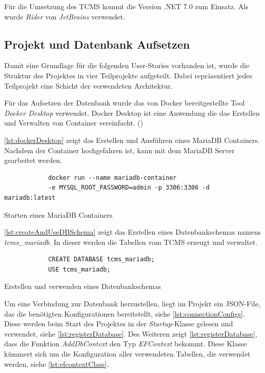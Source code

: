 \documentclass[a4paper, fontsize=11pt, parskip=half, twoside, headings=openright]{scrreprt}
\begin{document}
	Für die Umsetzung des \ac{TCMS} kommt die Version .NET 7.0 zum Einsatz.
	Als  wurde \emph{Rider} von \emph{JetBrains} verwendet.


	\subsection{Projekt und Datenbank Aufsetzen}
	Damit eine Grundlage für die folgenden User-Stories vorhanden ist, wurde die Struktur des Projektes in vier Teilprojekte aufgeteilt.
	Dabei repräsentiert jedes Teilprojekt eine Schicht der verwendeten Architektur.
	
	Für das Aufsetzen der Datenbank wurde das von Docker bereitgestellte Tool \emph{Docker Desktop} verwendet.
	Docker Desktop ist eine Anwendung die das Erstellen und Verwalten von Container vereinfacht. (\textcite{noauthor_docker_2022})
	
	\autoref{lst:dockerDesktop} zeigt das Erstellen und Ausführen eines MariaDB Containers.
	Nachdem der Container hochgefahren ist, kann mit dem MariaDB Server gearbeitet werden.
	
	\begin{listing}[ht]
		\begin{verbatim}
			docker run --name mariadb-container 
			-e MYSQL_ROOT_PASSWORD=admin -p 3306:3306 -d mariadb:latest
		\end{verbatim}
		\caption{Starten eines MariaDB Containers}
		\label{lst:dockerDesktop}
	\end{listing}

	\autoref{lst:createAndUseDBSchema} zeigt das Erstellen eines Datenbankschemas namens \emph{tcms\_mariadb}. 
	In dieser werden die Tabellen vom \ac{TCMS} erzeugt und verwaltet.
	
	\begin{listing}[ht]
		\begin{verbatim}
			CREATE DATABASE tcms_mariadb; 
			USE tcms_mariadb;
		\end{verbatim}
		\caption{Erstellen und verwenden eines Datenbankschemas}
		\label{lst:createAndUseDBSchema}
	\end{listing}

	Um eine Verbindung zur Datenbank herzustellen, liegt im Projekt ein \ac{JSON}-File, das die benötigten Konfigurationen bereitstellt, siehe \autoref{lst:connectionConfigs}.
	Diese werden beim Start des Projektes in der \emph{Startup}-Klasse gelesen und verwendet, siehe \autoref{lst:registerDatabase}.
	Des Weiteren zeigt \autoref{lst:registerDatabase}, dass die Funktion \emph{AddDbContext} den Typ \emph{EFContext} bekommt. 
	Diese Klasse kümmert sich um die Konfiguration aller verwendeten Tabellen, die verwendet werden, siehe \autoref{lst:efcontextClass}.
\end{document}
